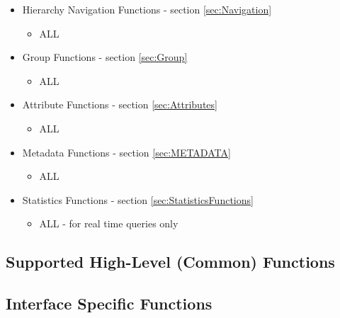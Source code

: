 \begin{itemize}[noitemsep,nolistsep] 
	\item{Hierarchy Navigation Functions - section \ref{sec:Navigation}}
		\begin{itemize}[noitemsep,nolistsep] 
			\item{ALL}
		\end{itemize}
	\item{Group Functions - section \ref{sec:Group}}
		\begin{itemize}[noitemsep,nolistsep] 
			\item{ALL}
		\end{itemize}
	\item{Attribute Functions - section \ref{sec:Attributes}}
		\begin{itemize}[noitemsep,nolistsep] 
			\item{ALL}
		\end{itemize}
	\item{Metadata Functions - section \ref{sec:METADATA}}
		\begin{itemize}[noitemsep,nolistsep] 
			\item{ALL}
		\end{itemize}
	\item{Statistics Functions - section \ref{sec:StatisticsFunctions}}
		\begin{itemize}[noitemsep,nolistsep] 
			\item{ALL - for real time queries only}
		\end{itemize}
\end{itemize}


\subsection{Supported High-Level (Common) Functions}\label{sec:OSHWHighLevel}


\subsection{Interface Specific Functions}\label{sec:OSHWFunctions}

